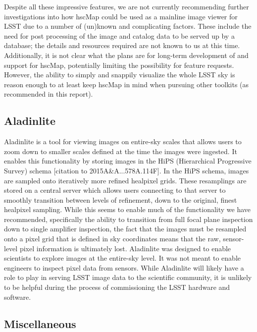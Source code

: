 Despite all these impressive features, we are not currently recommending further investigations into how hscMap could be used as a mainline image viewer for LSST due to a number of (un)known and complicating factors.  These include the need for post processing of the image and catalog data to be served up by a database; the details and resources required are not known to us at this time.  Additionally, it is not clear what the plans are for long-term development of and support for hscMap, potentially limiting the possibility for feature requests.  However, the ability to simply and snappily visualize the whole LSST sky is reason enough to at least keep hscMap in mind when pursuing other toolkits (as recommended in this report).


\subsection{Aladinlite}

Aladinlite is a tool for viewing images on entire-sky scales that allows users
to zoom down to smaller scales defined at the time the images were ingested.
It enables this functionality by storing images in the HiPS (Hierarchical
Progressive Survey) schema [citation to 2015A\&A...578A.114F].  In the HiPS
schema, images are sampled onto iteratively more refined healpixel grids.  These
resamplings are stored on a central server which allows users connecting to that
server to smoothly transition between levels of refinement, down to the
original, finest healpixel sampling.  While this seems to enable much of the
functionality we have recommended, specifically the ability to transition from
full focal plane inspection down to single amplifier inspection, the fact that
the images must be resampled onto a pixel grid that is defined in sky
coordinates means that the raw, sensor-level pixel information is ultimately
lost.  Aladinlite was designed to enable scientists to explore images at the
entire-sky level.  It was not meant to enable engineers to inspect pixel data
from sensors.  While Aladinlite will likely have a role to play in serving LSST
image data to the scientific community, it is unlikely to be helpful during the
process of commissioning the LSST hardware and software.

\subsection{Miscellaneous}
